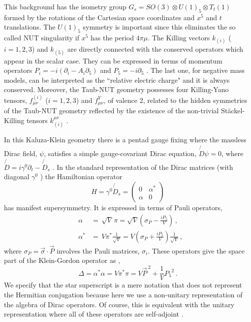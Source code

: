 \documentclass[a4paper,12pt]{article}
\begin{document}
This background has the isometry group  
$G_{s}=SO(3)\otimes U(1)_5\otimes T_{t}(1)$ formed by the rotations of the 
Cartesian space coordinates and $x^{5}$ and $t$ translations. The $U(1)_5$ 
symmetry is important since this eliminates the so called NUT singularity
if $x^5$ has the period $4\pi\mu$. The  Killing vectors $k_{(i)}$ 
($i=1,2,3$) and $k_{(5)}$  are directly connected with the conserved 
operators which appear in the scalar case. They can be expressed in terms 
of momentum operators 
$P_{i}=-i(\partial_{i}-A_{i}\partial_{5})$ and $P_{5}=-i\partial_{5}$
\cite{GRFH}. The last one, for negative mass models, can be interpreted 
as the ``relative electric charge"  and it is always conserved.
Moreover, the Taub-NUT geometry possesses four 
Killing-Yano tensors, $f^{(i)}_{\mu\nu}$ ($i=1,2,3$) and $f^Y_{\mu\nu}$, 
of valence 2, related to the hidden symmetries of the Taub-NUT geometry  
reflected by the existence of the non-trivial St\" ackel-Killing tensors 
$k_{(i)}^{\mu\nu}$ \cite{GRFH,VV,CV2,CV1}.


In this Kaluza-Klein geometry there is a pentad gauge fixing \cite{P} where 
the  massless Dirac field, 
$\psi$, satisfies a simple gauge-covariant Dirac equation, 
$\not{\!\!D}\psi=0$, where 
$\not{\!\!D}=i\gamma^{0}\partial_{t}-\not{\!\!D}_{s}$
 \cite{DKK,DIRAC,CV2,CV4}. 
In the standard representation of the Dirac matrices (with diagonal 
$\gamma^0$  \cite{TH}) the Hamiltonian operator \cite{CV2,CV4}
\begin{equation}\label{HH}
H =\gamma^0\not{\!\!D}_{s}
=\left(
\begin{array}{cc}
0&\alpha^{*}\\
\alpha&0
\end{array}\right)
\end{equation}
has manifest supersymmetry. It is expressed in terms of Pauli operators,  
\begin{eqnarray}
&\alpha&=\,\sqrt{V}\,\pi 
=\sqrt{V}\left( {\sigma}_{P}-\frac{iP_{5}}{V}\right)\,,\\ 
&\alpha^{*}&=\,V\pi^{*}\frac{1}{\sqrt{V}} 
=V\left({\sigma}_{P}+\frac{iP_{5}}{V}\right)\frac{1}{\sqrt{V}}\,, 
\end{eqnarray}
where $\sigma_P=\vec{\sigma}\cdot\vec{P}$ involves the Pauli matrices, 
$\sigma_i$. These  operators give the space part of the  Klein-Gordon 
operator as \cite{CV2,CV4},  
\begin{equation}
\Delta= \alpha^{*}\alpha=V\pi^{*}\pi= 
V{\vec{P}\,}^{2}+\frac{1}{V}{P_{5}}^{2}\,.
\end{equation}
We specify that the 
star superscript is a mere notation that does not represent the Hermitian 
conjugation because here we use a non-unitary representation of the 
algebra of Dirac operators. Of course, this is equivalent with the unitary 
representation where all of these operators are self-adjoint \cite{CV2}. 
 
\end{document}
